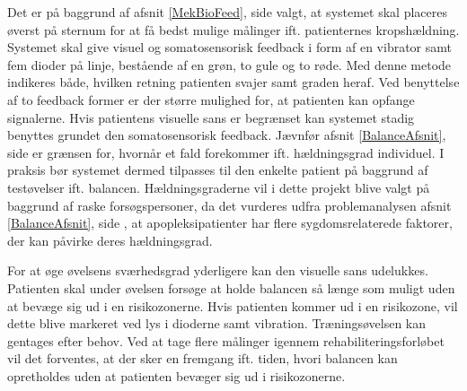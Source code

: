 Det er på baggrund af afsnit \ref{MekBioFeed}, side \pageref{MekBioFeed} valgt, at systemet skal placeres øverst på sternum for at få bedst mulige målinger ift. patienternes kropshældning. Systemet skal give visuel og somatosensorisk feedback i form af en vibrator samt fem dioder på linje, bestående af en grøn, to gule og to røde. Med denne metode indikeres både, hvilken retning patienten svajer samt graden heraf. Ved benyttelse af to feedback former er der større mulighed for, at patienten kan opfange signalerne. Hvis patientens visuelle sans er begrænset kan systemet stadig benyttes grundet den somatosensorisk feedback. Jævnfør afsnit \ref{BalanceAfsnit}, side \pageref{BalanceAfsnit} er grænsen for, hvornår et fald forekommer ift. hældningsgrad individuel. I praksis bør systemet dermed tilpasses til den enkelte patient på baggrund af testøvelser ift. balancen. Hældningsgraderne vil i dette projekt blive valgt på baggrund af raske forsøgspersoner, da det vurderes udfra problemanalysen afsnit \ref{BalanceAfsnit}, side \pageref{BalanceAfsnit}, at apopleksipatienter har flere sygdomsrelaterede faktorer, der kan påvirke deres hældningsgrad. 


For at øge øvelsens sværhedsgrad yderligere kan den visuelle sans udelukkes. Patienten skal under øvelsen forsøge at holde balancen så længe som muligt uden at bevæge sig ud i en risikozonerne. Hvis patienten kommer ud i en risikozone, vil dette blive markeret ved lys i dioderne samt vibration. Træningsøvelsen kan gentages efter behov. Ved at tage flere målinger igennem rehabiliteringsforløbet vil det forventes, at der sker en fremgang ift. tiden, hvori balancen kan opretholdes uden at patienten bevæger sig ud i risikozonerne. 

